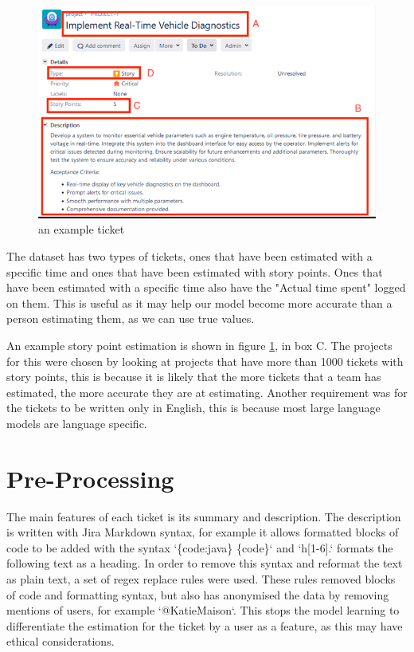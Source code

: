 \documentclass{UoYCSproject}
\begin{document}
    \begin{figure}[h]
        \includegraphics[width=\textwidth]{./figures/dummy-ticket}
        \caption{an example ticket}
        \label{fig:ticket}
    \end{figure}

    The dataset has two types of tickets, ones that have been estimated with a specific time and ones that have been estimated with story points.
    Ones that have been estimated with a specific time also have the "Actual time spent" logged on them.
    This is useful as it may help our model become more accurate than a person estimating them, as we can use true values. \par
    An example story point estimation is shown in figure \ref{fig:ticket}, in box C.
    The projects for this were chosen by looking at projects that have more than 1000 tickets with story points, this is because it is likely that the more tickets that a team has estimated, the more accurate they are at estimating.
    Another requirement was for the tickets to be written only in English, this is because most large language models are language specific.


    \section{Pre-Processing}\label{sec:preprocessing}

    The main features of each ticket is its summary and description.
    The description is written with Jira Markdown syntax, for example it allows formatted blocks of code to be added with the syntax `\{code:java\} \{code\}` and `h[1-6].` formats the following text as a heading.
    In order to remove this syntax and reformat the text as plain text, a set of regex replace rules were used.
    These rules removed blocks of code and formatting syntax, but also has anonymised the data by removing mentions of users, for example `@KatieMaison`.
    This stops the model learning to differentiate the estimation for the ticket by a user as a feature, as this may have ethical considerations. \par
\end{document}
